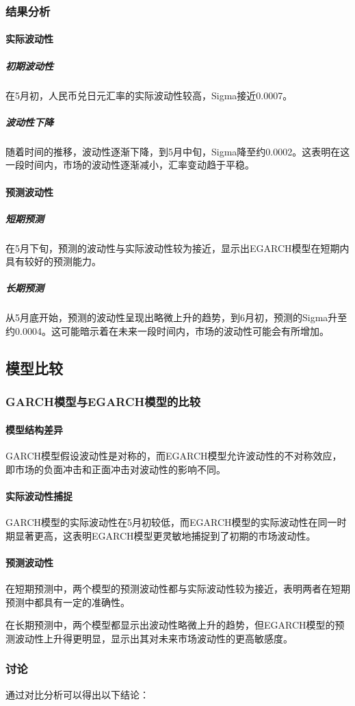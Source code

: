 \subsubsection{结果分析}
\paragraph{实际波动性}
\subparagraph{初期波动性}在5月初，人民币兑日元汇率的实际波动性较高，Sigma接近0.0007。
\subparagraph{波动性下降}随着时间的推移，波动性逐渐下降，到5月中旬，Sigma降至约0.0002。这表明在这一段时间内，市场的波动性逐渐减小，汇率变动趋于平稳。
\paragraph{预测波动性}
\subparagraph{短期预测}在5月下旬，预测的波动性与实际波动性较为接近，显示出EGARCH模型在短期内具有较好的预测能力。
\subparagraph{长期预测}从5月底开始，预测的波动性呈现出略微上升的趋势，到6月初，预测的Sigma升至约0.0004。这可能暗示着在未来一段时间内，市场的波动性可能会有所增加。

\subsection{模型比较}
\subsubsection{GARCH模型与EGARCH模型的比较}
\paragraph{模型结构差异}GARCH模型假设波动性是对称的，而EGARCH模型允许波动性的不对称效应，即市场的负面冲击和正面冲击对波动性的影响不同。
\paragraph{实际波动性捕捉}GARCH模型的实际波动性在5月初较低，而EGARCH模型的实际波动性在同一时期显著更高，这表明EGARCH模型更灵敏地捕捉到了初期的市场波动性。
\paragraph{预测波动性}
在短期预测中，两个模型的预测波动性都与实际波动性较为接近，表明两者在短期预测中都具有一定的准确性。

在长期预测中，两个模型都显示出波动性略微上升的趋势，但EGARCH模型的预测波动性上升得更明显，显示出其对未来市场波动性的更高敏感度。

\subsubsection{讨论}
通过对比分析可以得出以下结论：
